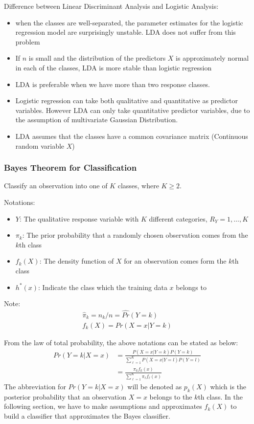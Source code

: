 \documentclass[12pt,a4paper]{article}%
\theoremstyle{definition}
\theoremstyle{plain}
\numberwithin{equation}{section}
\begin{document}
Difference between Linear Discriminant Analysis and Logistic Analysis:
\begin{itemize}
\item when the classes are well-separated, the parameter estimates for the logistic regression model are surprisingly unstable. LDA does not suffer from this problem
\item If $n$ is small and the distribution of the predictors $X$ is approximately normal in each of the classes, LDA is more stable than logistic regression
\item LDA is preferable when we have more than two response classes.
\item Logistic regression can take both qualitative and quantitative as predictor variables. However LDA can only take quantitative predictor variables, due to the assumption of multivariate Gaussian Distribution.
\item LDA assumes that the classes have a common covariance matrix
(Continuous random variable $X$)
\end{itemize}

\subsubsection{\textbf{Bayes Theorem for Classification}}
Classify an observation into one of $K$ classes, where $K \geq 2$.

Notations: 
\begin{itemize}
\item $Y$: The qualitative response variable with $K$ different categories, $R_{Y} = {1,\dots,K}$
\item $\pi_{k}$: The prior probability that a randomly chosen observation comes from the $k$th class
\item $f_{k}(X)$: The density function of $X$ for an observation comes form the $k$th class
\item $h^{*}(x)$: Indicate the class which the training data $x$ belongs to
\end{itemize}

\begin{framed}
Note:
\begin{gather*}
\hat{\pi}_{k} = n_{k}/n = \hat{Pr}(Y=k) \\
f_{k}(X) = Pr(X=x|Y=k)
\end{gather*}
\end{framed}
From the law of total probability, the above notations can be stated as below:
\begin{align*}
Pr(Y=k|X=x) &= \frac{P(X=x|Y=k)P(Y=k)}{\sum\limits_{\ell=1}^{K} P(X=x|Y=l)P(Y=l)} \\
  	        &= \frac{\pi_{k}f_{k}(x)}{\sum\limits_{\ell=1}^{K}\pi_{\ell}f_{\ell}(x)}
\label{lda}
\end{align*}
The abbreviation for $Pr(Y=k|X=x)$ will be denoted as $p_{k}(X)$ which is the posterior probability that an observation $X=x$ belongs to the $k$th class.
In the following section, we have to make assumptions and approximates $f_{k}(X)$ to build a classifier that approximates the Bayes classifier.
\end{document}
